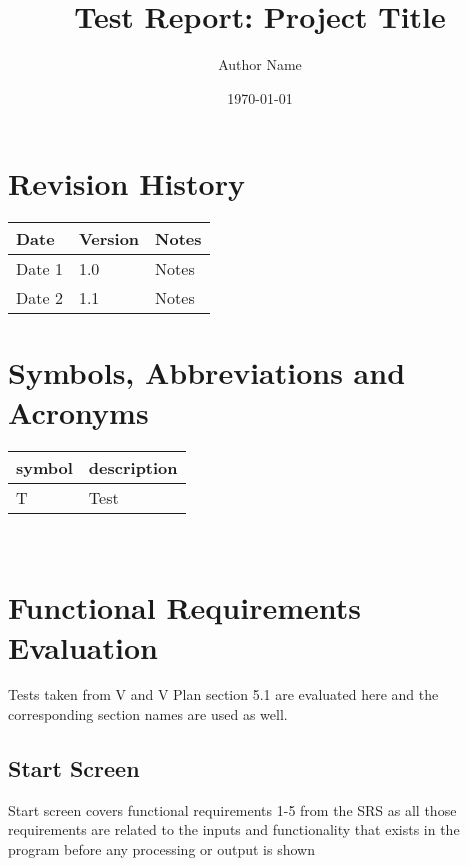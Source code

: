 \documentclass[12pt, titlepage]{article}
\begin{document}
\title{Test Report: Project Title} 
\author{Author Name}
\date{\today}
	
\maketitle


\tableofcontents

\newpage

\section{Revision History}

\begin{tabularx}{\textwidth}{p{3cm}p{2cm}X}
\toprule {\bf Date} & {\bf Version} & {\bf Notes}\\
\midrule
Date 1 & 1.0 & Notes\\
Date 2 & 1.1 & Notes\\
\bottomrule
\end{tabularx}

\section{Symbols, Abbreviations and Acronyms}

\renewcommand{\arraystretch}{1.2}
\begin{tabular}{l l} 
  \toprule		
  \textbf{symbol} & \textbf{description}\\
  \midrule 
  T & Test\\
  \bottomrule
\end{tabular}\\

\newpage


\newpage


\section{Functional Requirements Evaluation}
Tests taken from V and V Plan section 5.1 are evaluated here and the corresponding section names are used as well.

\subsection{Start Screen}

Start screen covers functional requirements 1-5 from the SRS as all those requirements 
are related to the inputs and functionality that exists in the program before any 
processing or output is shown
		
\end{document}
